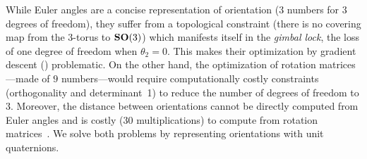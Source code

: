While Euler angles are a concise representation of orientation ($3$ numbers for $3$ degrees of freedom), they suffer from a topological constraint (there is no covering map from the $3$-torus to $\mathrm{\mathbf{SO}}(3)$) which manifests itself in the \textit{gimbal lock}, the loss of one degree of freedom when $\theta_2=0$. %
This makes their optimization by gradient descent () problematic.
On the other hand, the optimization of rotation matrices---made of $9$ numbers---would require computationally costly constraints (orthogonality and determinant~1) to reduce the number of degrees of freedom to $3$.
Moreover, the distance between orientations cannot be directly computed from Euler angles and is costly (30 multiplications) to compute from rotation matrices~\cite{huynh2009metrics}.
We solve both problems by representing orientations with unit quaternions.

